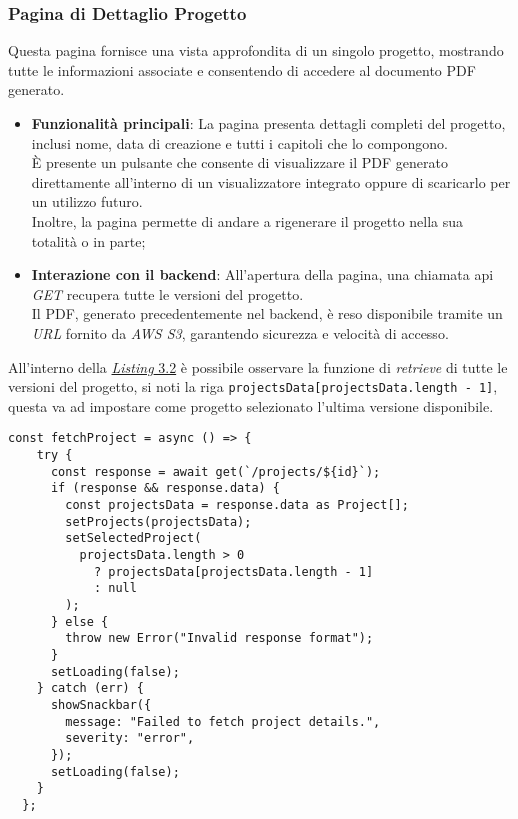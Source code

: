 \subsubsection{Pagina di Dettaglio Progetto}
Questa pagina fornisce una vista approfondita di un singolo progetto, mostrando tutte le informazioni associate e consentendo di accedere al documento PDF generato.
\begin{itemize}
    \item \textbf{Funzionalità principali}: La pagina presenta dettagli completi del progetto, inclusi nome, data di creazione e tutti i capitoli che lo compongono.\\
    È presente un pulsante che consente di visualizzare il PDF generato direttamente all'interno di un visualizzatore integrato oppure di scaricarlo per un utilizzo futuro.\\
    Inoltre, la pagina permette di andare a rigenerare il progetto nella sua totalità o in parte;
    \item \textbf{Interazione con il \gls{backend}}: All'apertura della pagina, una chiamata \gls{api} \textit{GET} recupera tutte le versioni del progetto.\\
    Il PDF, generato precedentemente nel \gls{backend}, è reso disponibile tramite un \textit{URL} fornito da \textit{AWS S3}, garantendo sicurezza e velocità di accesso. 
\end{itemize}

\noindent All'interno della {\hyperref[lst:single-project-page]{\textit{Listing} 3.2}} è possibile osservare la funzione di \textit{retrieve} di tutte le versioni del progetto, si noti la riga \texttt{projectsData[projectsData.length - 1]}, questa va ad impostare come progetto selezionato l'ultima versione disponibile.
\pagebreak
\begin{lstlisting}[caption={Funzione di \textit{retrieve} di tutte le versioni dei progetti}, label={lst:single-project-page}]
  const fetchProject = async () => {
    try {
      const response = await get(`/projects/${id}`);
      if (response && response.data) {
        const projectsData = response.data as Project[];
        setProjects(projectsData);
        setSelectedProject(
          projectsData.length > 0
            ? projectsData[projectsData.length - 1]
            : null
        );
      } else {
        throw new Error("Invalid response format");
      }
      setLoading(false);
    } catch (err) {
      showSnackbar({
        message: "Failed to fetch project details.",
        severity: "error",
      });
      setLoading(false);
    }
  };
  \end{lstlisting}
